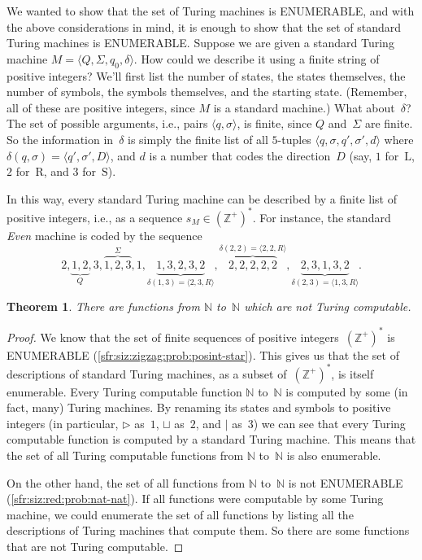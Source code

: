 \documentclass[10pt,a4paper]{article}
\newcommand*{\olup}[1]{\MakeUppercase{#1}}
\theoremstyle{plain}
\newtheorem{thm}{Theorem}[section]
\theoremstyle{definition}
\theoremstyle{remark}
\newenvironment{explain}{}{}
\providecommand{\tuple}[1]{\langle #1 \rangle}
\providecommand{\Nat}{\ensuremath{\mathbb{N}}}
\providecommand{\PosInt}{\mathbb{Z}^{+}}
\providecommand{\TMblank}{\sqcup}
\providecommand{\TMstroke}{\mid}
\providecommand{\TMstay}{\mathrm{S}}
\providecommand{\TMright}{\mathrm{R}}
\providecommand{\TMleft}{\mathrm{L}}
\providecommand{\TMendtape}{\triangleright}
\providecommand{\cref}[1]{\ref{#1}}
\begin{document}
\begin{explain}
We wanted to show that the set of Turing machines is \olup{enumerable},
and with the above considerations in mind, it is enough to show that
the set of standard Turing machines is \olup{enumerable}. Suppose we are
given a standard Turing machine $M = \tuple{Q, \Sigma, q_0, \delta}$.
How could we describe it using a finite string of positive integers?
We'll first list the number of states, the states themselves, the
number of symbols, the symbols themselves, and the starting state.
(Remember, all of these are positive integers, since $M$ is a standard
machine.)  What about~$\delta$? The set of possible arguments, i.e.,
pairs $\tuple{q,\sigma}$, is finite, since $Q$ and~$\Sigma$ are
finite. So the information in~$\delta$ is simply the finite list of
all $5$-tuples $\tuple{q, \sigma, q', \sigma', d}$ where
$\delta(q,\sigma) = \tuple{q', \sigma', D}$, and $d$ is a number that
codes the direction~$D$ (say, $1$ for~$\TMleft$, $2$ for~$\TMright$,
and $3$ for~$\TMstay$).

In this way, every standard Turing machine can be described by a
finite list of positive integers, i.e., as a sequence $s_M \in
(\PosInt)^*$. For instance, the standard \emph{Even} machine is coded
by the sequence
\[
2, \underbrace{1, 2}_Q, 3, \overbrace{1, 2, 3}^\Sigma, 1, \underbrace{1, 3, 2, 3, 2}_{\delta(1,3) = \tuple{2,3,R}}, 
\overbrace{2, 2, 2, 2, 2}^{\delta(2,2) = \tuple{2,2,R}},
\underbrace{2, 3, 1, 3, 2}_{\delta(2,3) = \tuple{1,3,R}}.
\]
\end{explain}

\begin{thm}
There are functions from $\Nat$ to~$\Nat$ which are not Turing
computable.
\end{thm}

\begin{proof}
We know that the set of finite sequences of positive
integers~$(\PosInt)^*$ is \olup{enumerable}
(\cref{sfr:siz:zigzag:prob:posint-star}). This gives us that the set
of descriptions of standard Turing machines, as a subset
of~$(\PosInt)^*$, is itself enumerable.  Every Turing computable
function $\Nat$ to~$\Nat$ is computed by some (in fact, many) Turing
machines. By renaming its states and symbols to positive integers (in
particular, $\TMendtape$ as~$1$, $\TMblank$ as~$2$, and $\TMstroke$
as~$3$) we can see that every Turing computable function is computed
by a standard Turing machine. This means that the set of all Turing
computable functions from $\Nat$ to~$\Nat$ is also enumerable.

On the other hand, the set of all functions from $\Nat$ to~$\Nat$ is
not \olup{enumerable} (\cref{sfr:siz:red:prob:nat-nat}). If all functions
were computable by some Turing machine, we could enumerate the set of
all functions by listing all the descriptions of Turing machines that
compute them. So there are some functions that are not Turing
computable. 
\end{proof}
\end{document}
